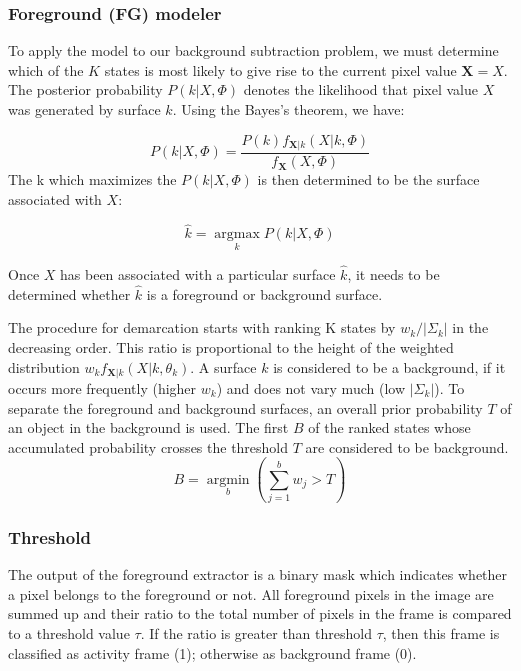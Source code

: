 \subsubsection{Foreground (FG) modeler}
To apply the model to our background subtraction problem, we must determine which of the $K$ states is most likely to give rise to the current pixel value $\mathbf{X}=X$. The posterior probability $P(k|X,\Phi)$ denotes the likelihood that pixel value $X$ was generated by surface $k$. Using the Bayes's theorem, we have:

$$ P(k|X,\Phi) = \frac{P(k)f_{\mathbf{X}|k}(X|k,\Phi)}{f_\mathbf{X}(X,\Phi)} $$
The k which maximizes the $P(k|X,\Phi) $ is then determined to be the surface associated with $X$:

$$ \hat{k}=\operatorname*{argmax}_k P(k|X,\Phi)$$

Once $X$ has been associated with a particular surface $\hat{k}$, it needs to be determined whether $\hat{k}$ is a foreground or background surface. 

The procedure for demarcation starts with ranking K states by $w_k / | \Sigma_k |$ in the decreasing order. This ratio is proportional to the height of the weighted distribution $w_k f_{\mathbf{X}|k}(X|k,\theta_k)$. A surface $k$ is considered to be a background, if it occurs more frequently (higher $w_k$) and does not vary much (low $|\Sigma_k|$).  To separate the foreground and background surfaces, an overall prior probability $T$ of an object in the background is used. The first $B$ of the ranked  states whose accumulated probability crosses the threshold $T$ are considered to be background. 
$$ B=\operatorname*{argmin}_b (\sum_{j=1}^b w_{j} > T)$$ 

\subsubsection{Threshold}
The output of the foreground extractor is a binary mask which indicates whether a pixel belongs to the foreground or not. All foreground pixels in the image are summed up and their ratio to the total number of pixels in the frame is compared to a threshold value $\tau$. If the ratio is greater than threshold $\tau$, then this frame is classified as activity frame (1); otherwise as background frame (0). 


